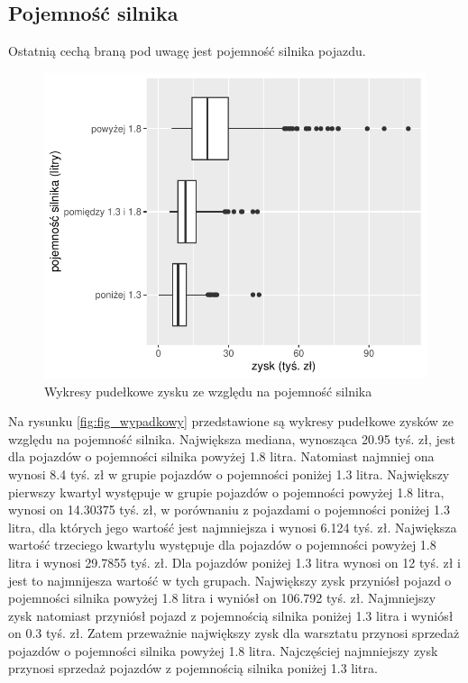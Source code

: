 \documentclass{article}\usepackage[]{graphicx}\usepackage[]{xcolor}
\makeatletter
\def\maxwidth{ %
  \ifdim\Gin@nat@width>\linewidth
    \linewidth
  \else
    \Gin@nat@width
  \fi
}
\newenvironment{knitrout}{}{} %
\makeatother
\begin{document}
\subsection{Pojemność silnika}

Ostatnią cechą braną pod uwagę jest pojemność silnika pojazdu.

\begin{knitrout}
\color{fgcolor}\begin{figure}[H]

{\centering \includegraphics[width=\maxwidth]{figure/fig_pojemnosc-1} 

}

\caption[Wykresy pudełkowe zysku ze względu na pojemność silnika]{Wykresy pudełkowe zysku ze względu na pojemność silnika}\label{fig:fig_pojemnosc}
\end{figure}

\end{knitrout}

Na rysunku \ref{fig:fig_wypadkowy} przedstawione są wykresy pudełkowe zysków ze względu na pojemność silnika. Największa mediana, wynosząca 20.95 tyś. zł, jest dla pojazdów o pojemności silnika powyżej 1.8 litra. Natomiast najmniej ona wynosi 8.4 tyś. zł w grupie pojazdów o pojemności poniżej 1.3 litra. 
Największy pierwszy kwartyl występuje w grupie pojazdów o pojemności powyżej 1.8 litra, wynosi on 14.30375 tyś. zł, w porównaniu z pojazdami o pojemności poniżej 1.3 litra, dla których jego wartość jest najmniejsza i wynosi 6.124 tyś. zł.
Największa wartość trzeciego kwartylu występuje dla pojazdów o pojemności powyżej 1.8 litra i wynosi 29.7855 tyś. zł. Dla pojazdów poniżej 1.3 litra wynosi on 12 tyś. zł i jest to najmnijesza wartość w tych grupach.
Największy zysk przyniósł pojazd o pojemności silnika powyżej 1.8 litra i wyniósł on 106.792 tyś. zł. 
Najmniejszy zysk natomiast przyniósł pojazd z pojemnością silnika poniżej 1.3 litra i wyniósł on 0.3 tyś. zł. Zatem przeważnie największy zysk dla warsztatu przynosi sprzedaż pojazdów o pojemności silnika powyżej 1.8 litra. Najczęściej najmniejszy zysk przynosi sprzedaż pojazdów z pojemnością silnika poniżej 1.3 litra.
\end{document}
